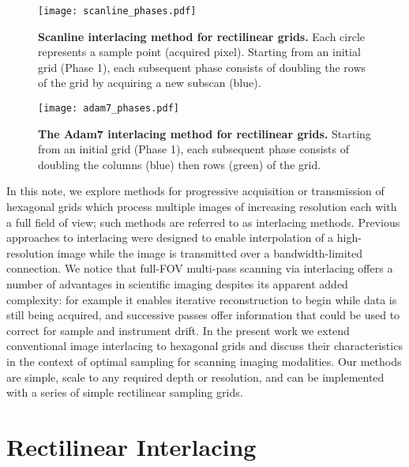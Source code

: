 \documentclass[aip, amsmath, amssymb, nobibnotes, nofootinbib, citeautoscript, reprint, superscriptaddress]{revtex4-2}
\begin{document}
    \begin{figure}
        \texttt{[image: scanline\_phases.pdf]}
            \caption{
                \label{fig:scanlinephases}
                \textbf{Scanline interlacing method for rectilinear grids.}
                Each circle represents a sample point (acquired pixel).
                Starting from an initial grid (Phase 1), each subsequent phase consists of
                doubling the rows of the grid by acquiring a new subscan (blue).
                }
    \end{figure}

    \begin{figure}
        \texttt{[image: adam7\_phases.pdf]}
            \caption{
                \label{fig:adam7phases}
                \textbf{The Adam7 interlacing method for rectilinear grids.}
                Starting from an initial grid (Phase 1), each subsequent phase consists of doubling the columns (blue) then rows (green) of the grid.
            }
    \end{figure}
    

    In this note, we explore methods for progressive acquisition or transmission of hexagonal grids which process multiple images of increasing resolution each with a full field of view; such methods are referred to as interlacing methods.
    Previous approaches to interlacing were designed to enable interpolation of a high-resolution image while the image is transmitted over a bandwidth-limited connection.
    We notice that full-FOV multi-pass scanning via interlacing offers a number of advantages in scientific imaging despites its apparent added complexity: for example it enables iterative reconstruction to begin while data is still being acquired, and successive passes offer information that could be used to correct for sample and instrument drift.
    In the present work we extend conventional image interlacing to hexagonal grids and discuss their characteristics in the context of optimal sampling for scanning imaging modalities.
    Our methods are simple, scale to any required depth or resolution, and can be implemented with a series of simple rectilinear sampling grids.

    \section{\label{sec:rect}Rectilinear Interlacing}
\end{document}
